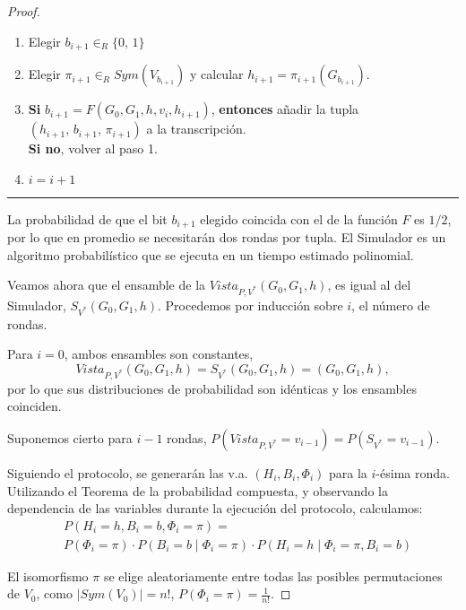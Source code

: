\begin{proof}
	\begin{enumerate}
		\item Elegir $b_{i+1} \in_R \{0,\,1\}$
		
		\item Elegir $\pi_{i+1} \in_R Sym(V_{b_{i+1}})$ y calcular $h_{i+1}=\pi_{i+1}(G_{b_{i+1}})$.
		
		\item \textbf{Si} $b_{i+1} = F(G_0,G_1,h,v_i,h_{i+1})$, \textbf{entonces} añadir la tupla \\ $(h_{i+1},\,b_{i+1},\,\pi_{i+1})$ a la transcripción. \\
		\textbf{Si no}, volver al paso 1.
		
		\item $i = i+1$
		
	\end{enumerate}
	
	\rule{\textwidth}{1pt}
	
	\hfill
	
	
	La probabilidad de que el bit $b_{i+1}$ elegido coincida con el de la función $F$ es $1/2$, por lo que en promedio se necesitarán dos rondas por tupla. El Simulador es un algoritmo probabilístico que se ejecuta en un tiempo estimado polinomial.
	
	\hfil
	
	Veamos ahora que el ensamble de la $Vista_{P,V^*}(G_0, G_1 ,h)$, es igual al del Simulador, $S_{V^*}(G_0, G_1 ,h)$. Procedemos por inducción sobre $i$, el número de rondas.
	
	Para $i=0$, ambos ensambles son constantes,
	\[Vista_{P,V^*}(G_0, G_1 ,h)=S_{V^*}(G_0, G_1 ,h)=(G_0, G_1, h),\]
	por lo que sus distribuciones de probabilidad son idénticas y los ensambles coinciden.
	
	Suponemos cierto para $i-1$ rondas, $P(Vista_{P,V^*}=v_{i-1}) = P(S_{V^*}=v_{i-1})$.
	
	Siguiendo el protocolo, se generarán las v.a. $(H_i, B_i, \Phi_i)$ para la $i$-ésima ronda. Utilizando el Teorema de la probabilidad compuesta, y observando la dependencia de las variables durante la ejecución del protocolo, calculamos:
	\begin{align*}
	& P(H_i=h, B_i=b, \Phi_i = \pi) = \\
	& P(\Phi_i = \pi) \cdot P(B_i = b \mid \Phi_i = \pi) \cdot P(H_i = h \mid \Phi_i = \pi, B_i=b)
	\end{align*}

	El isomorfismo $\pi$ se elige aleatoriamente entre todas las posibles permutaciones de $V_0$, como $\mid Sym(V_0) \mid = n!$, $P(\Phi_i = \pi) = \frac{1}{n!}$.
	

\end{proof}
